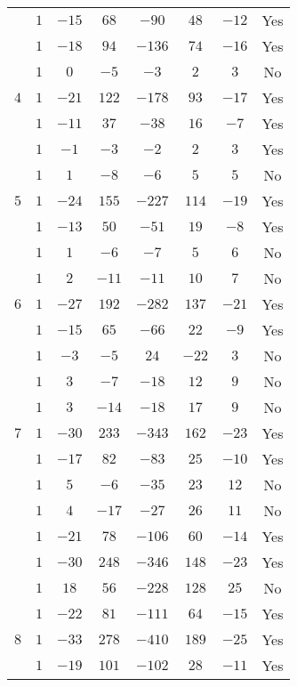 \documentclass{amsart}
\theoremstyle{plain}
\theoremstyle{definition}
\theoremstyle{remark}
\begin{document}
\begin{small}
\begin{longtable}{|c||c|c|c|c|c|c|c|}
& $1$ & $-15$ & $68$ & $-90$ & $48$ & $-12$ & Yes \\ \cline{2-8}
& $1$ & $-18$ & $94$ & $-136$ & $74$ & $-16$ & Yes \\ \cline{2-8}
& $1$ & $0$ & $-5$ & $-3$ & $2$ & $3$ & No \\ \hline
$4$ & $1$ & $-21$ & $122$ & $-178$ & $93$ & $-17$ & Yes \\ \cline{2-8}
& $1$ & $-11$ & $37$ & $-38$ & $16$ & $-7$ & Yes \\ \cline{2-8}
& $1$ & $-1$ & $-3$ & $-2$ & $2$ & $3$ & Yes \\ \cline{2-8}
& $1$ & $1$ & $-8$ & $-6$ & $5$ & $5$ & No \\ \hline
$5$ & $1$ & $-24$ & $155$ & $-227$ & $114$ & $-19$ & Yes \\ \cline{2-8}
& $1$ & $-13$ & $50$ & $-51$ & $19$ & $-8$ & Yes \\ \cline{2-8}
& $1$ & $1$ & $-6$ & $-7$ & $5$ & $6$ & No \\ \cline{2-8}
& $1$ & $2$ & $-11$ & $-11$ & $10$ & $7$ & No \\ \hline
$6$ & $1$ & $-27$ & $192$ & $-282$ & $137$ & $-21$ & Yes \\ \cline{2-8}
& $1$ & $-15$ & $65$ & $-66$ & $22$ & $-9$ & Yes \\ \cline{2-8}
& $1$ & $-3$ & $-5$ & $24$ & $-22$ & $3$ & No \\ \cline{2-8}
& $1$ & $3$ & $-7$ & $-18$ & $12$ & $9$ & No \\ \cline{2-8}
& $1$ & $3$ & $-14$ & $-18$ & $17$ & $9$ & No \\ \hline
$7$ & $1$ & $-30$ & $233$ & $-343$ & $162$ & $-23$ & Yes \\ \cline{2-8}
& $1$ & $-17$ & $82$ & $-83$ & $25$ & $-10$ & Yes \\ \cline{2-8}
& $1$ & $5$ & $-6$ & $-35$ & $23$ & $12$ & No \\ \cline{2-8}
& $1$ & $4$ & $-17$ & $-27$ & $26$ & $11$ & No \\ \cline{2-8}
& $1$ & $-21$ & $78$ & $-106$ & $60$ & $-14$ & Yes \\ \cline{2-8}
& $1$ & $-30$ & $248$ & $-346$ & $148$ & $-23$ & Yes \\ \cline{2-8}
& $1$ & $18$ & $56$ & $-228$ & $128$ & $25$ & No \\ \cline{2-8}
& $1$ & $-22$ & $81$ & $-111$ & $64$ & $-15$ & Yes \\ \hline
$8$ & $1$ & $-33$ & $278$ & $-410$ & $189$ & $-25$ & Yes \\ \cline{2-8}
& $1$ & $-19$ & $101$ & $-102$ & $28$ & $-11$ & Yes \\ \cline{2-8}

\end{longtable}
\end{small}
\end{document}
